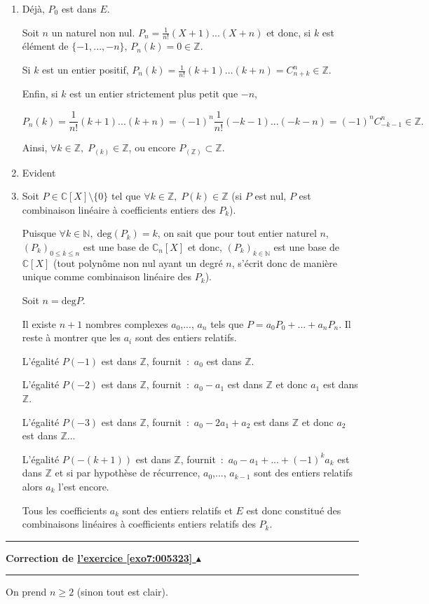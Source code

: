 \documentclass[11pt,a4paper]{article}
\newcommand{\Nn}{\mathbb{N}} \newcommand{\N}{\mathbb{N}}
\newcommand{\Zz}{\mathbb{Z}} \newcommand{\Z}{\mathbb{Z}}
\newcommand{\Cc}{\mathbb{C}} \newcommand{\C}{\mathbb{C}}
\newcounter{exo}
\newcommand{\correction}[1]{\hypertarget{cor7:#1}{}\label{cor7:#1}{\bf Correction de \hyperlink{exo7:#1}{l'exercice \ref{exo7:#1} $\blacktriangle$}}\vspace{1mm}\hrule\vspace{1mm}}
\newcommand{\fincorrection}{\vspace{1mm}\hrule\vspace*{7mm}}
\begin{document}
\begin{enumerate}
\item  Déjà, $P_0$ est dans $E$.

Soit $n$ un naturel non nul. $P_n=\frac{1}{n!}(X+1)...(X+n)$ et donc, si $k$ est élément de $\{-1,...,-n\}$, $P_n(k)=0\in\Zz$.

Si $k$ est un entier positif, $P_n(k)=\frac{1}{n!}(k+1)...(k+n)=C_{n+k}^n\in\Zz$.

Enfin, si $k$ est un entier strictement plus petit que $-n$, 

$$P_n(k)=\frac{1}{n!}(k+1)...(k+n)=(-1)^n\frac{1}{n!}(-k-1)...(-k-n)=(-1)^nC_{-k-1}^n\in\Zz.$$

Ainsi, $\forall k\in\Zz,\;P_(k)\in\Zz$, ou encore $P_(\Zz)\subset\Zz$.

\item  Evident

\item  Soit $P\in\Cc[X]\setminus\{0\}$ tel que $\forall k\in\Zz,\;P(k)\in\Zz$ (si $P$ est nul, $P$ est combinaison linéaire à coefficients entiers des $P_k$).

Puisque $\forall k\in\Nn,\;\mbox{deg}(P_k)=k$, on sait que pour tout entier naturel $n$, $(P_k)_{0\leq k\leq n}$ est une base de $\Cc_n[X]$ et donc, $(P_k)_{k\in\Nn}$ est une base de $\Cc[X]$ (tout polynôme non nul ayant un degré $n$, s'écrit donc de manière unique comme combinaison linéaire des $P_k$).

Soit $n=\mbox{deg}P$.

Il existe $n+1$ nombres complexes $a_0$,..., $a_n$ tels que $P=a_0P_0+...+a_nP_n$. Il reste à montrer que les $a_i$ sont des entiers relatifs.

L'égalité $P(-1)$ est dans $\Zz$, fournit~:~$a_0$ est dans $\Zz$.

L'égalité $P(-2)$ est dans $\Zz$, fournit~:~$a_0-a_1$ est dans $\Zz$ et donc $a_1$ est dans $\Zz$.

L'égalité $P(-3)$ est dans $\Zz$, fournit~:~$a_0-2a_1+a_2$ est dans $\Zz$ et donc $a_2$ est dans $\Zz$...

L'égalité $P(-(k+1))$ est dans $\Zz$, fournit~:~$a_0-a_1+...+(-1)^ka_k$ est dans $\Zz$ et si par hypothèse de récurrence, $a_0$,..., $a_{k-1}$ sont des entiers relatifs alors $a_k$ l'est encore.

Tous les coefficients $a_k$ sont des entiers relatifs et $E$ est donc constitué des combinaisons linéaires à coefficients entiers relatifs des $P_k$.
\end{enumerate}
\fincorrection
\correction{005323}
On prend $n\geq2$ (sinon tout est clair).
\end{document}
